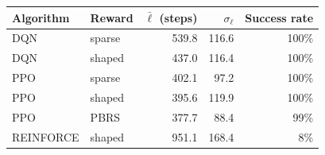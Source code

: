 \begin{tabular}{llrrr}
\toprule
Algorithm & Reward & $\bar{\ell}$ (steps) & $\sigma_\ell$ & Success rate \\
\midrule
DQN & sparse & 539.8 & 116.6 & 100\% \\
DQN & shaped & 437.0 & 116.4 & 100\% \\
PPO & sparse & 402.1 & 97.2 & 100\% \\
PPO & shaped & 395.6 & 119.9 & 100\% \\
PPO & PBRS & 377.7 & 88.4 & 99\% \\
REINFORCE & shaped & 951.1 & 168.4 & 8\% \\
\bottomrule
\end{tabular}

